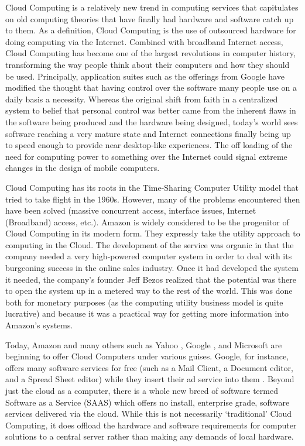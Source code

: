Cloud Computing is a relatively new trend in computing services that capitulates
on old computing theories that have finally had hardware and software catch up
to them.  As a definition, Cloud Computing is the use of outsourced hardware for
doing computing via the Internet.  Combined with broadband Internet access,
Cloud Computing has become one of the largest revolutions in computer history,
transforming the way people think about their computers and how they should be
used.  Principally, application suites such as the offerings from Google have
modified the thought that having control over the software many people use on a
daily basis a necessity.  Whereas the original shift from faith in a centralized
system to belief that personal control was better came from the inherent flaws
in the software being produced and the hardware being designed, today's world
sees software reaching a very mature state and Internet connections finally
being up to speed enough to provide near desktop-like experiences.  The off
loading of the need for computing power to something over the Internet could
signal extreme changes in the design of mobile computers.

Cloud Computing has its roots in the Time-Sharing Computer Utility model that
tried to take flight in the 1960s.  However, many of the problems encountered
then have been solved (massive concurrent access, interface issues, Internet
(Broadband) access, etc.).  Amazon is widely considered to be the progenitor of
Cloud Computing in its modern form.  They expressly take the utility approach to
computing in the Cloud.  The development of the service was organic in that the
company needed a very high-powered computer system in order to deal with its
burgeoning success in the online sales industry.  Once it had developed the
system it needed, the company's founder Jeff Bezos realized that the potential
was there to open the system up in a metered way to the rest of the world.  This
was done both for monetary purposes (as the computing utility business model is
quite lucrative) and because it was a practical way for getting more information
into Amazon's systems.

Today, Amazon \citep{reiss2008} and many others such as Yahoo \citep{yahoo2009},
Google \citep{baker2007}, and Microsoft \citep{reiss2008} are beginning to offer
Cloud Computers under various guises.  Google, for instance, offers many
software services for free (such as a Mail Client, a Document editor, and a
Spread Sheet editor) while they insert their ad service into them
\citep{mcdougall2007}.  Beyond just the cloud as a computer, there is a whole
new breed of software termed Software as a Service (SAAS) which offers no
install, enterprise grade, software services delivered via the cloud.  While
this is not necessarily `traditional' Cloud Computing, it does offload the
hardware and software requirements for computer solutions to a central server
rather than making any demands of local hardware.

